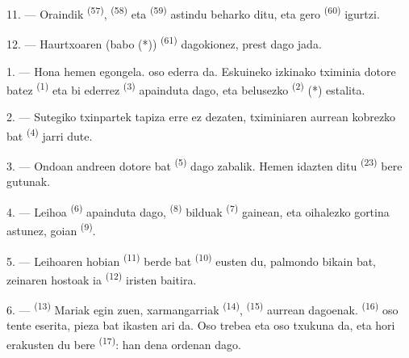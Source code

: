 

11. --- Oraindik  \textsuperscript{(57)},
 \textsuperscript{(58)} eta 
\textsuperscript{(59)} astindu beharko ditu, eta gero 
\textsuperscript{(60)} igurtzi.

12. --- Haurtxoaren (babo (*))  \textsuperscript{(61)}
dagokionez, prest dago jada.

\VUsaut{5.0mm}
\VUsaut{3.0mm}

1. --- Hona hemen egongela.  oso ederra da. Eskuineko izkinako
tximinia  dotore batez \textsuperscript{(1)} eta bi
 ederrez \textsuperscript{(3)} apainduta dago, eta belusezko
 \textsuperscript{(2)} (*) estalita.

2. --- Sutegiko txinpartek tapiza erre ez dezaten, tximiniaren aurrean kobrezko
 bat \textsuperscript{(4)} jarri dute.

3. --- Ondoan andreen  dotore bat \textsuperscript{(5)} dago
zabalik. Hemen idazten ditu  \textsuperscript{(23)} bere
gutunak.

4. --- Leihoa  \textsuperscript{(6)} apainduta dago,
 \textsuperscript{(8)} bilduak 
\textsuperscript{(7)} gainean, eta oihalezko gortina astunez, goian
 \textsuperscript{(9)}.

5. --- Leihoaren hobian  \textsuperscript{(11)}
 berde bat \textsuperscript{(10)} eusten du, palmondo bikain bat,
zeinaren hostoak ia  \textsuperscript{(12)} iristen
baitira.

6. ---  \textsuperscript{(13)} Mariak egin zuen,
 xarmangarriak \textsuperscript{(14)}, 
\textsuperscript{(15)} aurrean dagoenak. 
\textsuperscript{(16)} oso tente eserita, pieza bat ikasten ari da. Oso trebea eta
oso txukuna da, eta hori erakusten du bere 
\textsuperscript{(17)}: han dena ordenan dago.

